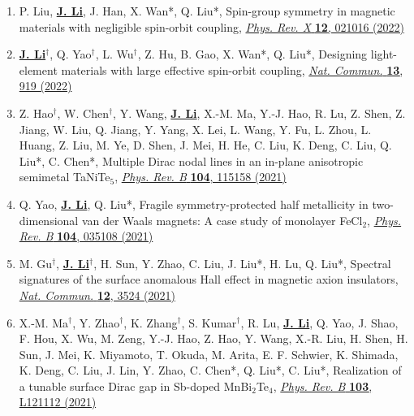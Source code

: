\documentclass[a4paper,11pt]{article}
\begin{document}
\begin{enumerate}[leftmargin=*]
    \item P. Liu, \underline{\textbf{J. Li}}, J. Han, X. Wan*, Q. Liu*, Spin-group symmetry in magnetic materials with negligible spin-orbit coupling, \href{https://doi.org/10.1103/PhysRevX.12.021016}{\textit{Phys. Rev. X} \textbf{12}, 021016 (2022)}

    \item \underline{\textbf{J. Li}}$^{\dagger}$, Q. Yao$^{\dagger}$, L. Wu$^{\dagger}$, Z. Hu, B. Gao, X. Wan*, Q. Liu*, Designing light-element materials with large effective spin-orbit coupling, \href{https://doi.org/10.1038/s41467-022-28534-y}{\textit{Nat. Commun.} \textbf{13}, 919 (2022)}

    \item Z. Hao$^{\dagger}$, W. Chen$^{\dagger}$, Y. Wang, \underline{\textbf{J. Li}}, X.-M. Ma, Y.-J. Hao, R. Lu, Z. Shen, Z. Jiang, W. Liu, Q. Jiang, Y. Yang, X. Lei, L. Wang, Y. Fu, L. Zhou, L. Huang, Z. Liu, M. Ye, D. Shen, J. Mei, H. He, C. Liu, K. Deng, C. Liu, Q. Liu*, C. Chen*, Multiple Dirac nodal lines in an in-plane anisotropic semimetal TaNiTe$_5$, \href{https://doi.org/10.1103/PhysRevB.104.115158}{\textit{Phys. Rev. B} \textbf{104}, 115158 (2021)}

    \item Q. Yao, \underline{\textbf{J. Li}}, Q. Liu*, Fragile symmetry-protected half metallicity in two-dimensional van der Waals magnets: A case study of monolayer FeCl$_2$, \href{https://doi.org/10.1103/PhysRevB.104.035108}{\textit{Phys. Rev. B} \textbf{104}, 035108 (2021)}

    \item M. Gu$^{\dagger}$, \underline{\textbf{J. Li}}$^{\dagger}$, H. Sun, Y. Zhao, C. Liu, J. Liu*, H. Lu, Q. Liu*, Spectral signatures of the surface anomalous Hall effect in magnetic axion insulators, \href{https://doi.org/10.1038/s41467-021-23844-z}{\textit{Nat. Commun.} \textbf{12}, 3524 (2021)}

    \item X.-M. Ma$^{\dagger}$, Y. Zhao$^{\dagger}$, K. Zhang$^{\dagger}$, S. Kumar$^{\dagger}$, R. Lu, \underline{\textbf{J. Li}}, Q. Yao, J. Shao, F. Hou, X. Wu, M. Zeng, Y.-J. Hao, Z. Hao, Y. Wang, X.-R. Liu, H. Shen, H. Sun, J. Mei, K. Miyamoto, T. Okuda, M. Arita, E. F. Schwier, K. Shimada, K. Deng, C. Liu, J. Lin, Y. Zhao, C. Chen*, Q. Liu*, C. Liu*, Realization of a tunable surface Dirac gap in Sb-doped MnBi$_2$Te$_4$, \href{https://doi.org/10.1103/PhysRevB.103.L121112}{\textit{Phys. Rev. B} \textbf{103}, L121112 (2021)}


\end{enumerate}
\end{document}

